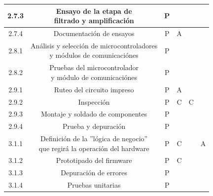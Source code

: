 \documentclass[11pt]{charter}
\begin{document}
\begin{table}[H]
{\begin{tabular}{|c|c|c|c|c|c|}
 2.7.3& \shortstack{Ensayo de la etapa de\\filtrado y amplificación}& P &  &  &  \\ \hline
 2.7.4& Documentación de ensayos & P & A &  &  \\ \hline
 2.8.1& \shortstack{Análisis y selección de microcontroladores\\y módulos de comunicaciónes} & P &  &  &  \\ \hline
 2.8.2& \shortstack{Pruebas del microcontrolador\\y módulo de comunicaciónes} & P &  &  &  \\ \hline
 2.9.1& Ruteo del circuito impreso & P & A &  &  \\ \hline
 2.9.2& Inspección & P & C & C &  \\ \hline
 2.9.3& Montaje y soldado de componentes & P &  &  &  \\ \hline
 2.9.4& Prueba y depuración & P &  &  &  \\ \hline
 3.1.1& \shortstack{Definición de la ”lógica de negocio”\\que regirá la operación del hardware} & P & C &  & A \\ \hline
 3.1.2& Prototipado del firmware & P & C &  &  \\ \hline
 3.1.3& Depuración de errores & P &  &  &  \\ \hline
 3.1.4& Pruebas unitarias & P &  &  &  \\ \hline
\end{tabular}%
}
\end{table}
\end{document}
